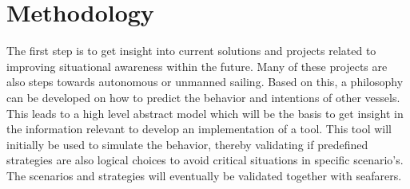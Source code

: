 \section{Methodology}
The first step is to get insight into current solutions and projects related to improving situational awareness within the future. Many of these projects are also steps towards autonomous or unmanned sailing. Based on this, a philosophy can be developed on how to predict the behavior and intentions of other vessels. This leads to a high level abstract model which will be the basis to get insight in the information relevant to develop an implementation of a tool. This tool will initially be used to simulate the behavior, thereby validating if predefined strategies are also logical choices to avoid critical situations in specific scenario's. The scenarios and strategies will eventually be validated together with seafarers.
